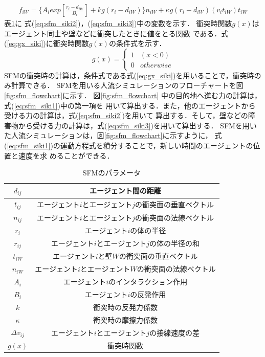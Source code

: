 %
\begin{eqnarray}
 f_{iW} = \{A_i exp[\frac{r_{i} - d_{iW}}{B_i}]
  + kg(r_{i} - d_{iW})\} n_{iW} + \kappa g (r_{i} - d_{iW})
  (v_i t_{iW}) t_{iW}
 \label{eq:sfm_siki3}
\end{eqnarray}
%
表\ref{tab:tab_para}に
式(\ref{eq:sfm_siki2})，(\ref{eq:sfm_siki3})中の変数を示す．
衝突時関数$g(x)$はエージェント同士や壁などに衝突したときに値をとる関数
である．式(\ref{eq:gx_siki})に衝突時関数$g(x)$の条件式を示す．
%
\begin{equation}
  \label{eq:gx_siki}
  g(x) =
  \begin{cases}
    1 & (x<0) \\
    0 & otherwise
  \end{cases}
\end{equation}
%
SFMの衝突時の計算は，条件式である式(\ref{eq:gx_siki})を用いることで，衝突時のみ計算できる．
SFMを用いる人流シミュレーションのフローチャートを図
\ref{fig:sfm_flowchart}に示す．
図\ref{fig:sfm_flowchart} 中の目的地へ進む力の計算は，式(\ref{eq:sfm_siki1})中の第一項を
用いて算出する．また，他のエージェントから受ける力の計算は，式(\ref{eq:sfm_siki2})を用いて
算出する．そして，壁などの障害物から受ける力の計算は，式(\ref{eq:sfm_siki3})を用いて算出する．
SFMを用いた人流シミュレーションは，図\ref{fig:sfm_flowchart}に示すように，
式(\ref{eq:sfm_siki1})の運動方程式を積分することで，新しい時間のエージェントの位置と速度を求
めることができる．


\begin{table}[hbtp]
 \begin{center}
  \caption{SFMのパラメータ}
    \begin{tabular}{c|c}
     \hline \hline
     $d_{ij}$ & エージェント間の距離 \\
     \hline
     $t_{ij}$ & エージェント$i$とエージェント$j$の衝突面の垂直ベクトル \\
     \hline
     $n_{ij}$ & エージェント$i$とエージェント$j$の衝突面の法線ベクトル\\
     \hline
     $r_i$ & エージェント$i$の体の半径 \\
     \hline
     $r_{ij}$ & エージェント$i$とエージェント$j$の体の半径の和 \\
     \hline
     $t_{iW}$ & エージェント$i$と壁$W$の衝突面の垂直ベクトル\\
     \hline
     $n_{iW}$ & エージェント$i$とエージェント$W$の衝突面の法線ベクトル \\
     \hline
     $A_i$ & エージェント$i$のインタラクション作用 \\
     \hline
     $B_i$ & エージェント$i$の反発作用 \\
     \hline
     $k$ & 衝突時の反発力係数\\
     \hline
     $\kappa$ & 衝突時の摩擦力係数 \\
     \hline
     $\Delta v_{ij}$ & エージェント$i$とエージェント$j$の接線速度の差 \\
     \hline
     $g(x)$ & 衝突時関数 \\
     \hline
    \end{tabular}
  \label{tab:tab_para}
 \end{center}
\end{table}

